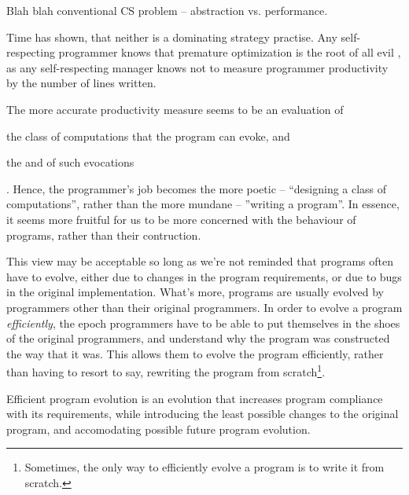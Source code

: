 Blah blah conventional CS problem -- abstraction vs. performance.

Time has shown, that neither is a dominating strategy practise. Any
self-respecting programmer knows that premature optimization is the root of all
evil \cite{knuth-goto}, as any self-respecting manager knows not to measure
programmer productivity by the number of lines written.


The more accurate productivity measure seems to be an evaluation of
\begin{inparaenum}[(1)] \item the class of computations that the program can
evoke, and \item the  and   of such
evocations\end{inparaenum}. Hence, the programmer's job becomes the more poetic
-- ``designing a class of computations'', rather than the more mundane --
''writing a program''. In essence, it seems more fruitful for us to be more
concerned with the behaviour of programs, rather than their contruction.

This view may be acceptable so long as we're not reminded that programs often
have to evolve, either due to changes in the program requirements, or due to
bugs in the original implementation. What's more, programs are usually evolved
by programmers other than their original programmers. In order to evolve a
program \emph{efficiently}, the epoch programmers have to be able to put
themselves in the shoes of the original programmers, and understand why the
program was constructed the way that it was.  This allows them to evolve the
program efficiently, rather than having to resort to say, rewriting the program
from scratch\footnote{Sometimes, the only way to efficiently evolve a program
is to write it from scratch.}.

\begin{definition}

Efficient program evolution is an evolution that increases program compliance
with its requirements, while introducing the least possible changes to the
original program, and accomodating possible future program  evolution.

\end{definition}

